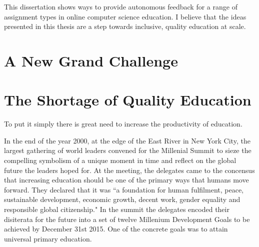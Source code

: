 This dissertation shows ways to provide autonomous feedback for a range of assignment types in online computer science education. I believe that the ideas presented in this thesis are a step towards inclusive, quality education at scale.

\section{A New Grand Challenge}

\section{The Shortage of Quality Education}

To put it simply there is great need to increase the productivity of education.

In the end of the year 2000, at the edge of the East River in New York City, the largest gathering of world leaders convened for the Millenial Summit to sieze the compelling symbolism of a unique moment in time and reflect on the  global future the leaders hoped for. At the meeting, the delegates came to the concensus that increasing education should be one of the primary ways that humans move forward. They declared that it was ``a foundation for human fulfilment, peace, sustainable development, economic
growth, decent work, gender equality and responsible global citizenship." In the summit the delegates encoded their disiterata for the future into a set of twelve Millenium Development Goals to be achieved by December 31st 2015. One of the concrete goals was to attain universal primary education. 

